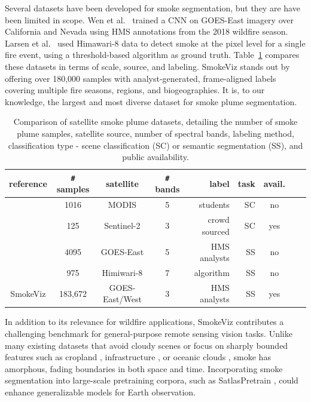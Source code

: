 \documentclass{article}
\begin{document}
Several datasets have been developed for smoke segmentation, but they are have been limited in scope. Wen et al.\ \cite{smoke_goes} trained a CNN on GOES-East imagery over California and Nevada using HMS annotations from the 2018 wildfire season. Larsen et al.\ \cite{larsen} used Himawari-8 data to detect smoke at the pixel level for a single fire event, using a threshold-based algorithm as ground truth. Table~\ref{studies} compares these datasets in terms of scale, source, and labeling. SmokeViz stands out by offering over 180,000 samples with analyst-generated, frame-aligned labels covering multiple fire seasons, regions, and biogeographies. It is, to our knowledge, the largest and most diverse dataset for smoke plume segmentation.


\begin{table}[h]
    \caption{Comparison of satellite smoke plume datasets, detailing the number of smoke plume samples, satellite source, number of spectral bands, labeling method, classification type - scene classification (SC) or semantic segmentation (SS), and public availability.}\label{studies}
    \centering
    \begin{tabular}{ccccrrcrc}
        \toprule
        reference & \verb|#| samples & satellite & \verb|#| bands & label & task & avail.\\
        \midrule
        \cite{smokenet}& 1016 & MODIS & 5 & students & SC & no \\
        \cite{satlas} & 125 & Sentinel-2 & 3 & crowd sourced & SC & yes \\
        \cite{smoke_goes}& 4095 & GOES-East & 5 & HMS analysts & SS & no \\
        \cite{larsen} & 975 & Himiwari-8 & 7 & algorithm& SS & no \\
        SmokeViz  & 183,672 & GOES-East/West & 3 & HMS analysts & SS & yes \\
        \bottomrule
    \end{tabular}
\end{table}

In addition to its relevance for wildfire applications, SmokeViz contributes a challenging benchmark for general-purpose remote sensing vision tasks. Unlike many existing datasets that avoid cloudy scenes \cite{bigearthnet, crops} or focus on sharply bounded features such as cropland \cite{crops}, infrastructure \cite{polyworld}, or oceanic clouds \cite{cyclone, cloud_texture}, smoke has amorphous, fading boundaries in both space and time. Incorporating smoke segmentation into large-scale pretraining corpora, such as SatlasPretrain \cite{satlas}, could enhance generalizable models for Earth observation.
\end{document}

